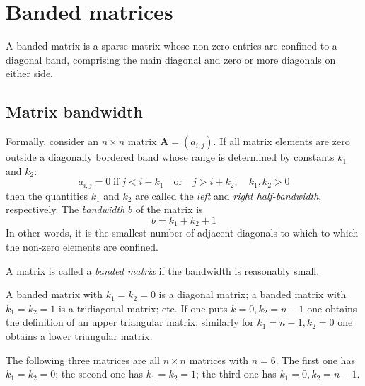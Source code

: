 
\section{Banded matrices} %
\label{sec:banded_matrices}

A banded matrix is a sparse matrix whose non-zero entries are confined to a diagonal band, comprising the main diagonal and zero or more diagonals on either side.

\subsection{Matrix bandwidth} %
\label{sub:matrix_bandwidth}
Formally, consider an $n\times n$ matrix $\mathbf{A}=(a_{i,j})$. If all matrix elements are zero outside a diagonally bordered band whose range is determined by constants $k_1$ and $k_2$:
\[
  a_{i,j} = 0 \; \text{if} \; j < i-k_1 \quad \text{or} \quad j > i + k_2; \quad k_1, k_2 > 0
\]
then the quantities $k_1$ and $k_2$ are called the \emph{left} and \emph{right half-bandwidth}, respectively. The \emph{bandwidth} $b$ of the matrix is
\begin{equation}
  b = k_1+k_2+1
\end{equation}
In other words, it is the smallest number of adjacent diagonals to which to which the non-zero elements are confined.

A matrix is called a \emph{banded matrix} if the bandwidth is reasonably small.

A banded matrix with $k_1=k_2=0$ is a diagonal matrix; a banded matrix with $k_1=k_2=1$ is a tridiagonal matrix; etc. If one puts $k=0, k_2=n-1$ one obtains the definition of an upper triangular matrix; similarly for $k_1=n-1, k_2=0$ one obtains a lower triangular matrix.

The following three matrices are all $n\times n$ matrices with $n=6$. The first one has $k_1=k_2=0$; the second one has $k_1=k_2=1$; the third one has $k_1=0, k_2=n-1$.



